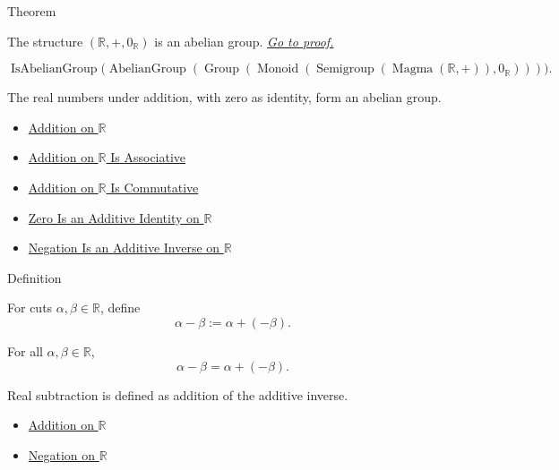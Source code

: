 \begin{theorembox}{Theorem}
\begin{theorem}
\label{thm:r-additive-abelian-group}
The structure
 $(\mathbb{R},+,0_{\mathbb{R}})$ is an abelian group.
\hyperref[prf:r-additive-abelian-group]{\textit{Go to proof.}}
\end{theorem}
\end{theorembox}

\begin{remark*}
\[
\operatorname{IsAbelianGroup}
\bigl(\operatorname{AbelianGroup}(
\operatorname{Group}(\operatorname{Monoid}(
\operatorname{Semigroup}(\operatorname{Magma}(\mathbb{R},+)),
0_{\mathbb{R}})))\bigr).
\]
\end{remark*}

\begin{remark*}[Interpretation]
The real numbers under addition, with zero as identity, form an abelian group.
\end{remark*}

\begin{dependencies}
\begin{itemize}
\item \hyperref[def:addition-on-r]{Addition on $\mathbb{R}$}
  \item \hyperref[thm:addition-on-r-associative]{Addition on $\mathbb{R}$ Is Associative}
  \item \hyperref[thm:addition-on-r-commutative]{Addition on $\mathbb{R}$ Is Commutative}
  \item \hyperref[thm:zero-additive-identity-on-r]{Zero Is an Additive Identity on $\mathbb{R}$}
  \item \hyperref[thm:negation-additive-inverse-on-r]{Negation Is an Additive Inverse on $\mathbb{R}$}
\end{itemize}
\end{dependencies}

\begin{definitionbox}{Definition}
\begin{definition}
\label{def:subtraction-on-r}
For cuts $\alpha,\beta\in\mathbb{R}$, define
\[
\alpha-\beta:=\alpha+(-\beta).
\]
\end{definition}
\end{definitionbox}

\begin{remark*}
For all $\alpha,\beta\in\mathbb{R}$,
\[
\alpha-\beta=\alpha+(-\beta).
\]
\end{remark*}

\begin{remark*}[Interpretation]
Real subtraction is defined as addition of the additive inverse.
\end{remark*}

\begin{dependencies}
\begin{itemize}
  \item \hyperref[def:addition-on-r]{Addition on $\mathbb{R}$}
  \item \hyperref[def:negation-on-r]{Negation on $\mathbb{R}$}
\end{itemize}
\end{dependencies}

